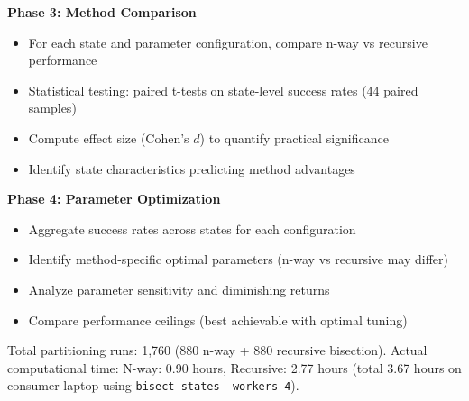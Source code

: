 \textbf{Phase 3: Method Comparison}
\begin{itemize}
\item For each state and parameter configuration, compare n-way vs recursive performance
\item Statistical testing: paired t-tests on state-level success rates (44 paired samples)
\item Compute effect size (Cohen's $d$) to quantify practical significance
\item Identify state characteristics predicting method advantages
\end{itemize}

\textbf{Phase 4: Parameter Optimization}
\begin{itemize}
\item Aggregate success rates across states for each configuration
\item Identify method-specific optimal parameters (n-way vs recursive may differ)
\item Analyze parameter sensitivity and diminishing returns
\item Compare performance ceilings (best achievable with optimal tuning)
\end{itemize}

Total partitioning runs: 1,760 (880 n-way + 880 recursive bisection). Actual computational time: N-way: 0.90 hours, Recursive: 2.77 hours (total 3.67 hours on consumer laptop using \texttt{bisect states --workers 4}).
